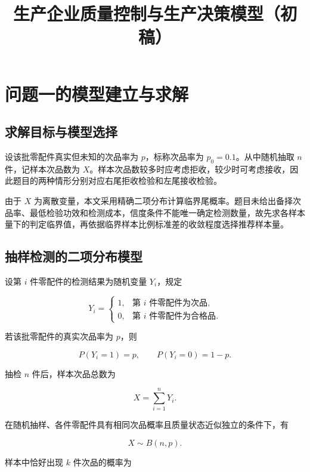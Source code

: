 \documentclass{cumcm}
\title{生产企业质量控制与生产决策模型（初稿）}
\numberwithin{figure}{section}
\numberwithin{table}{section}
\begin{document}
\maketitle

\setcounter{section}{4}

\section{问题一的模型建立与求解}\label{ux95eeux9898ux4e00ux7684ux6a21ux578bux5efaux7acbux4e0eux6c42ux89e3}

\subsection{求解目标与模型选择}\label{ux6c42ux89e3ux76eeux6807ux4e0eux6a21ux578bux9009ux62e9}

设该批零配件真实但未知的次品率为 \(p\)，标称次品率为 \(p_0=0.1\)。从中随机抽取 \(n\) 件，记样本次品数为 \(X\)。样本次品数较多时应考虑拒收，较少时可考虑接收，因此题目的两种情形分别对应右尾拒收检验和左尾接收检验。

由于 \(X\) 为离散变量，本文采用精确二项分布计算临界尾概率。题目未给出备择次品率、最低检验功效和检测成本，信度条件不能唯一确定检测数量，故先求各样本量下的判定临界值，再依据临界样本比例标准差的收敛程度选择推荐样本量。

\subsection{抽样检测的二项分布模型}\label{ux62bdux6837ux68c0ux6d4bux7684ux4e8cux9879ux5206ux5e03ux6a21ux578b}

设第 \(i\) 件零配件的检测结果为随机变量 \(Y_i\)，规定

\[
Y_i=
\begin{cases}
1, & \text{第 }i\text{ 件零配件为次品},\\
0, & \text{第 }i\text{ 件零配件为合格品}.
\end{cases}
\]

若该批零配件的真实次品率为 \(p\)，则

\[
P(Y_i=1)=p,\qquad P(Y_i=0)=1-p.
\]

抽检 \(n\) 件后，样本次品总数为

\[
X=\sum_{i=1}^{n}Y_i.
\]

在随机抽样、各件零配件具有相同次品概率且质量状态近似独立的条件下，有

\[
X\sim B(n,p). \tag{1}
\]

样本中恰好出现 \(k\) 件次品的概率为
\end{document}
